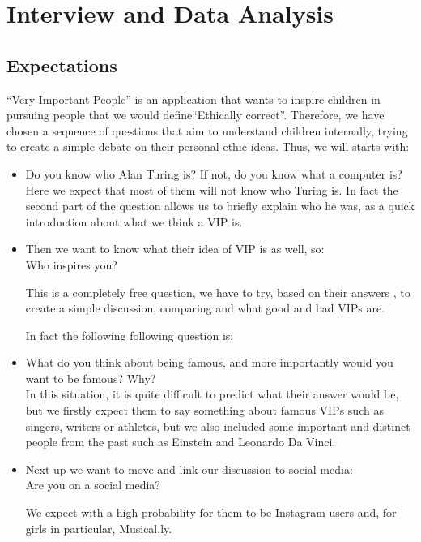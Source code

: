 \documentclass[12pt]{scrartcl}
\begin{document}
\section*{Interview and Data Analysis}
		\subsection*{Expectations}

	 ``Very Important People'' is an application that wants to inspire 
	children in pursuing people that we would define``Ethically correct''. Therefore, we have 
	chosen a sequence of questions that aim to understand children internally, trying to create a 		
	simple debate on their personal ethic ideas. Thus, we will starts with:

	\begin{itemize}
		\item Do you know who Alan Turing is? If not, do you know what a computer is?\\
		Here we expect that most of them will not know who Turing is. In fact the second part of the 
		question allows us to briefly explain who he was,  as a quick introduction about what we think 
		a VIP is.

		\item Then we want to know what their idea of VIP is as well, so:\\
		Who inspires you?
		
		This is a completely free question, we have to try, based on their answers , to create a simple 
		discussion, comparing and what good and bad VIPs are.
		
		In fact the following following question is:
		
		\item What do you think about being famous, and more importantly would you want to be 
		famous? Why?\\

		In this situation, it is quite difficult to predict what their answer would be, but we firstly expect 
		them to say something about famous VIPs such as singers, writers or athletes, but we also 
		included some important and distinct people from the past such as Einstein and Leonardo Da 
		Vinci.

		\item Next up we want to move and link our discussion to social media:\\
		Are you on a social media?

		We expect with a high probability for them to be Instagram users and, for girls in particular,
		Musical.ly.


\end{itemize}
\end{document}
